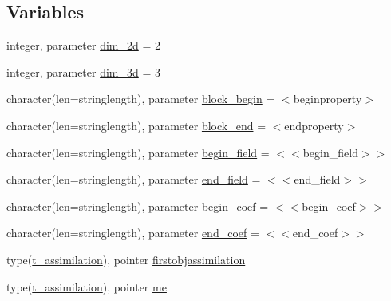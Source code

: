 \subsection*{Variables}
\begin{DoxyCompactItemize}
\item 
integer, parameter \mbox{\hyperlink{namespacemoduleassimilation_a34a9603a245a6727ce4bb588e23d6a1e}{dim\+\_\+2d}} = 2
\item 
integer, parameter \mbox{\hyperlink{namespacemoduleassimilation_afe612daf8dae0e1d9e9a616a4a7e0de3}{dim\+\_\+3d}} = 3
\item 
character(len=stringlength), parameter \mbox{\hyperlink{namespacemoduleassimilation_a499da09faa567dd1b80df1e7fa56474e}{block\+\_\+begin}} = \textquotesingle{}$<$beginproperty$>$\textquotesingle{}
\item 
character(len=stringlength), parameter \mbox{\hyperlink{namespacemoduleassimilation_a039648031db2c57e3be6056dfebfd3fd}{block\+\_\+end}} = \textquotesingle{}$<$endproperty$>$\textquotesingle{}
\item 
character(len=stringlength), parameter \mbox{\hyperlink{namespacemoduleassimilation_a753c8b8fc9c47fad51b9f7f9036be719}{begin\+\_\+field}} = \textquotesingle{}$<$$<$begin\+\_\+field$>$$>$\textquotesingle{}
\item 
character(len=stringlength), parameter \mbox{\hyperlink{namespacemoduleassimilation_a88cdda9c84dfaccb47eac5ddb047daf1}{end\+\_\+field}} = \textquotesingle{}$<$$<$end\+\_\+field$>$$>$\textquotesingle{}
\item 
character(len=stringlength), parameter \mbox{\hyperlink{namespacemoduleassimilation_a36b7146a3f9058e33923acb96c85e214}{begin\+\_\+coef}} = \textquotesingle{}$<$$<$begin\+\_\+coef$>$$>$\textquotesingle{}
\item 
character(len=stringlength), parameter \mbox{\hyperlink{namespacemoduleassimilation_a7b3120ad1932e896ddce3214175b5bfa}{end\+\_\+coef}} = \textquotesingle{}$<$$<$end\+\_\+coef$>$$>$\textquotesingle{}
\item 
type(\mbox{\hyperlink{structmoduleassimilation_1_1t__assimilation}{t\+\_\+assimilation}}), pointer \mbox{\hyperlink{namespacemoduleassimilation_a692d23fc7e1fb188a3a3f25d685b2bc6}{firstobjassimilation}}
\item 
type(\mbox{\hyperlink{structmoduleassimilation_1_1t__assimilation}{t\+\_\+assimilation}}), pointer \mbox{\hyperlink{namespacemoduleassimilation_a849747d57f21e4c2903903a340619bea}{me}}
\end{DoxyCompactItemize}


